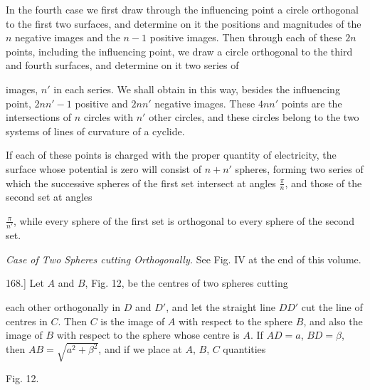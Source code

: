 \documentclass[11pt,a4paper]{article}
\begin{document}
In the fourth case we first draw through the influencing point a circle
orthogonal to the first two surfaces, and determine on it the positions
and magnitudes of the $n$ negative images and the $n-1$ positive
images. Then through each of these $2n$ points, including the
influencing point, we draw a circle orthogonal to the third and fourth
surfaces, and determine on it two series of

images, $n'$ in each series. We shall obtain in this way, besides the
influencing point, $2nn'-1$ positive and $2nn'$ negative images. These
$4nn'$ points are the intersections of $n$ circles with $n'$ other
circles, and these circles belong to the two systems of lines of
curvature of a cyclide.

If each of these points is charged with the proper quantity of
electricity, the surface whose potential is zero will consist of
$n+n'$ spheres, forming two series of which the successive spheres of
the first set intersect at angles $\frac{\pi}{n}$, and those of the
second set at angles

$\frac{\pi}{n'}$, while every sphere of the first set is orthogonal to
every sphere of the second set.

\begin{center}
\textit{Case of Two Spheres cutting Orthogonally.} See Fig. IV at the
end of this volume.
\end{center}

168.] Let $A$ and $B$, Fig. 12, be the centres of two spheres cutting

each other orthogonally in $D$ and $D'$, and let the straight line
$DD'$ cut the line of centres in $C$. Then $C$ is the image of $A$ with
respect to the sphere $B$, and also the image of $B$ with respect to
the sphere whose centre is $A$. If $AD=a$, $BD=\beta$, then
$AB=\sqrt{a^2+\beta^2}$, and if we place at $A$, $B$, $C$ quantities

\begin{center}

Fig. 12.
\end{center}
\end{document}
